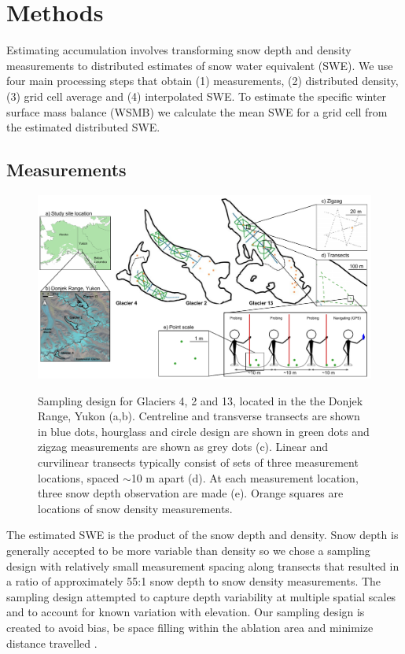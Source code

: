 \documentclass[twocolumn,letterpaper]{igs}
\begin{document}


\section{Methods}

Estimating accumulation involves transforming snow depth and density measurements to distributed estimates of snow water equivalent (SWE). We use four main processing steps that obtain (1) measurements, (2) distributed density, (3) grid cell average and (4) interpolated SWE. To estimate the specific winter surface mass balance (WSMB) we calculate the mean SWE for a grid cell from the estimated distributed SWE. 

\subsection{Measurements}

\begin{figure}
	\centering
	\includegraphics[width =\textwidth]{Sampling.pdf}\\
	\caption{Sampling design for Glaciers 4, 2 and 13, located in the the Donjek Range, Yukon (a,b). Centreline and transverse transects are shown in blue dots, hourglass and circle design are shown in green dots and zigzag measurements are shown as grey dots (c). Linear and curvilinear transects typically consist of sets of three measurement locations, spaced $\sim$10 m apart (d). At each measurement location, three snow depth observation are made (e). Orange squares are locations of snow density measurements. }
	\label{fig:Sampling}
\end{figure}

The estimated SWE is the product of the snow depth and density. Snow depth is generally accepted to be more variable than density \citep{Elder1991, Clark2011, Lopez2013} so we chose a sampling design with relatively small measurement spacing along transects that resulted in a ratio of approximately 55:1 snow depth to snow density measurements. The sampling design attempted to capture depth variability at multiple spatial scales and to account for known variation with elevation. Our sampling design is created to avoid bias, be space filling within the ablation area and minimize distance travelled \citep{Shea2010}.
\end{document}
